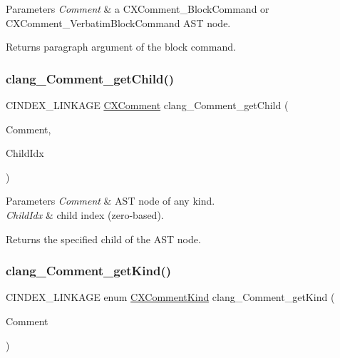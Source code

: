 \begin{DoxyParams}{Parameters}
{\em Comment} & a {\ttfamily C\+X\+Comment\+\_\+\+Block\+Command} or {\ttfamily C\+X\+Comment\+\_\+\+Verbatim\+Block\+Command} A\+ST node.\\
\hline
\end{DoxyParams}
\begin{DoxyReturn}{Returns}
paragraph argument of the block command. 
\end{DoxyReturn}
\mbox{\label{group__CINDEX__COMMENT_gad5567ecc26b083562e42b83170c105aa}} 
\subsubsection{\texorpdfstring{clang\+\_\+\+Comment\+\_\+get\+Child()}{clang\_Comment\_getChild()}}
{\footnotesize\ttfamily C\+I\+N\+D\+E\+X\+\_\+\+L\+I\+N\+K\+A\+GE \hyperlink{structCXComment}{C\+X\+Comment} clang\+\_\+\+Comment\+\_\+get\+Child (\begin{DoxyParamCaption}\item[{\hyperlink{structCXComment}{C\+X\+Comment}}]{Comment,  }\item[{unsigned}]{Child\+Idx }\end{DoxyParamCaption})}


\begin{DoxyParams}{Parameters}
{\em Comment} & A\+ST node of any kind.\\
\hline
{\em Child\+Idx} & child index (zero-\/based).\\
\hline
\end{DoxyParams}
\begin{DoxyReturn}{Returns}
the specified child of the A\+ST node. 
\end{DoxyReturn}
\mbox{\label{group__CINDEX__COMMENT_gad7f2a27ab2f69abcb9442e05a21a130f}} 
\subsubsection{\texorpdfstring{clang\+\_\+\+Comment\+\_\+get\+Kind()}{clang\_Comment\_getKind()}}
{\footnotesize\ttfamily C\+I\+N\+D\+E\+X\+\_\+\+L\+I\+N\+K\+A\+GE enum \hyperlink{group__CINDEX__COMMENT_ga3c336d80551401fde394b84aa5651221}{C\+X\+Comment\+Kind} clang\+\_\+\+Comment\+\_\+get\+Kind (\begin{DoxyParamCaption}\item[{\hyperlink{structCXComment}{C\+X\+Comment}}]{Comment }\end{DoxyParamCaption})}


